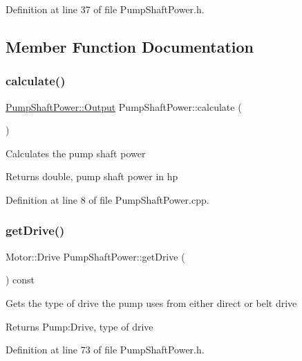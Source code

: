 Definition at line 37 of file Pump\+Shaft\+Power.\+h.



\subsection{Member Function Documentation}
\mbox{\label{class_pump_shaft_power_a0937a4e2e68682658a33ee4ea4ce00d8}} 
\subsubsection{\texorpdfstring{calculate()}{calculate()}}
{\footnotesize\ttfamily \hyperlink{struct_pump_shaft_power_1_1_output}{Pump\+Shaft\+Power\+::\+Output} Pump\+Shaft\+Power\+::calculate (\begin{DoxyParamCaption}{ }\end{DoxyParamCaption})}

Calculates the pump shaft power \begin{DoxyReturn}{Returns}
double, pump shaft power in hp 
\end{DoxyReturn}


Definition at line 8 of file Pump\+Shaft\+Power.\+cpp.

\mbox{\label{class_pump_shaft_power_a382653196fd65562cd3823049ab7573a}} 
\subsubsection{\texorpdfstring{get\+Drive()}{getDrive()}}
{\footnotesize\ttfamily Motor\+::\+Drive Pump\+Shaft\+Power\+::get\+Drive (\begin{DoxyParamCaption}{ }\end{DoxyParamCaption}) const\hspace{0.3cm}{\ttfamily [inline]}}

Gets the type of drive the pump uses from either direct or belt drive \begin{DoxyReturn}{Returns}
Pump\+:Drive, type of drive 
\end{DoxyReturn}


Definition at line 73 of file Pump\+Shaft\+Power.\+h.

